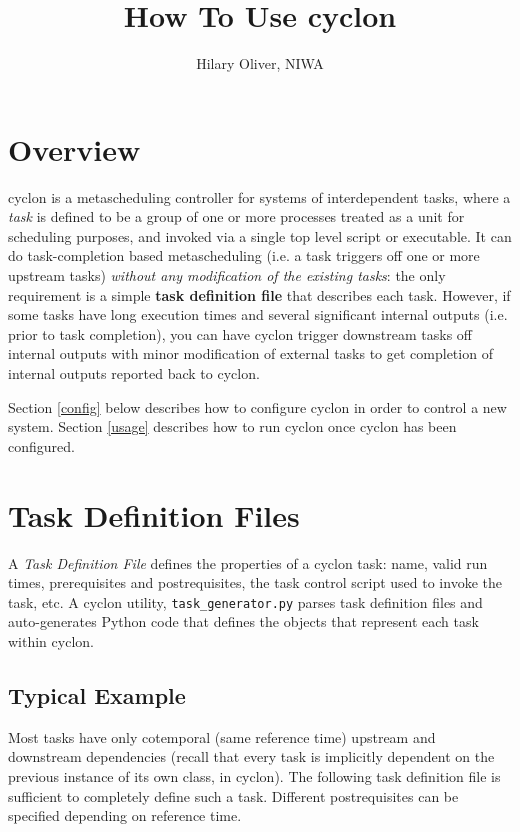 \documentclass[11pt,a4paper]{article}
\title{How To Use cyclon}
\author{Hilary Oliver, NIWA}
\begin{document}
\maketitle
\tableofcontents

\section{Overview}

cyclon is a metascheduling controller for systems of interdependent
tasks, where a {\em task} is defined to be a group of one or more
processes treated as a unit for scheduling purposes, and invoked via a
single top level script or executable.  It can do task-completion based
metascheduling (i.e. a task triggers off  one or more
upstream tasks) {\em without any modification of the existing tasks}:
the only requirement is a simple \textbf{task definition file} that
describes each task. However, if some tasks have long execution times
and several significant internal outputs (i.e. prior to task
completion), you can have cyclon trigger downstream tasks off internal
outputs with minor modification of external tasks to get completion of
internal outputs reported back to cyclon. 

Section \ref{config} below describes how to configure cyclon in order to
control a new system.  Section \ref{usage} describes how to run cyclon
once cyclon has been configured.

\label{config}
\section{Task Definition Files}

A {\em Task Definition File} defines the properties of a cyclon task:
name, valid run times, prerequisites and postrequisites, the task
control script used to invoke the task, etc.  A cyclon utility,
\verb=task_generator.py= parses task definition files and auto-generates
Python code that defines the objects that represent each task within
cyclon.

\subsection{Typical Example}

Most tasks have only cotemporal (same reference time) upstream and
downstream dependencies (recall that every task is implicitly dependent
on the previous instance of its own class, in cyclon). The following
task definition file is sufficient to completely define such a task.
Different postrequisites can be specified depending on reference time. 
\end{document}
